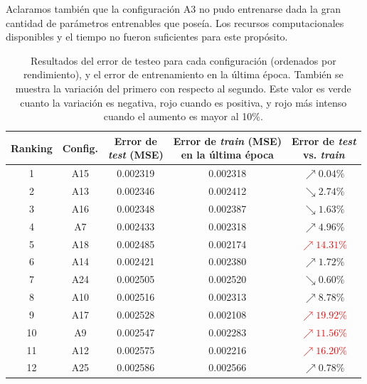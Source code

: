 Aclaramos también que la configuración A3 no pudo entrenarse dada la gran cantidad de parámetros entrenables que poseía. Los recursos computacionales disponibles y el tiempo no fueron suficientes para este propósito.


\begin{table}[htbp]
\centering
\caption{Resultados del error de testeo para cada configuración (ordenados por rendimiento), y el error de entrenamiento en la última época. También se muestra la variación del primero con respecto al segundo. Este valor es verde cuanto la variación es negativa, rojo cuando es positiva, y rojo más intenso cuando el aumento es mayor al 10\%.}
\label{tab:testing_results}
\footnotesize
\begin{tabular}{|c|c|c|c|c|}
\hline
\textbf{Ranking} &
\textbf{Config.} &
\makecell{\textbf{Error de} \\ \textbf{\emph{test} (MSE)}} &
\makecell{\textbf{Error de \emph{train} (MSE)} \\ \textbf{en la última época}} &
\makecell{\textbf{Error de \emph{test}} \\ \textbf{vs. \emph{train}}} \\
\hline
1 & A15 & 0.002319 & 0.002318 & \textcolor{rojito}{$\nearrow 0.04\%$} \\
2 & A13 & 0.002346 & 0.002412 & \textcolor{verdecito}{$\searrow 2.74\%$} \\
3 & A16 & 0.002348 & 0.002387 & \textcolor{verdecito}{$\searrow 1.63\%$} \\
4 & A7 & 0.002433 & 0.002318 & \textcolor{rojito}{$\nearrow 4.96\%$} \\
5 & A18 & 0.002485 & 0.002174 & \textcolor{red}{$\nearrow 14.31\%$} \\
6 & A14 & 0.002421 & 0.002380 & \textcolor{rojito}{$\nearrow 1.72\%$} \\
7 & A24 & 0.002505 & 0.002520 & \textcolor{verdecito}{$\searrow 0.60\%$} \\
8 & A10 & 0.002516 & 0.002313 & \textcolor{rojito}{$\nearrow 8.78\%$} \\
9 & A17 & 0.002528 & 0.002108 & \textcolor{red}{$\nearrow 19.92\%$} \\
10 & A9 & 0.002547 & 0.002283 & \textcolor{red}{$\nearrow 11.56\%$} \\
11 & A12 & 0.002575 & 0.002216 & \textcolor{red}{$\nearrow 16.20\%$} \\
12 & A25 & 0.002586 & 0.002566 & \textcolor{rojito}{$\nearrow 0.78\%$} \\

\end{tabular}
\end{table}
